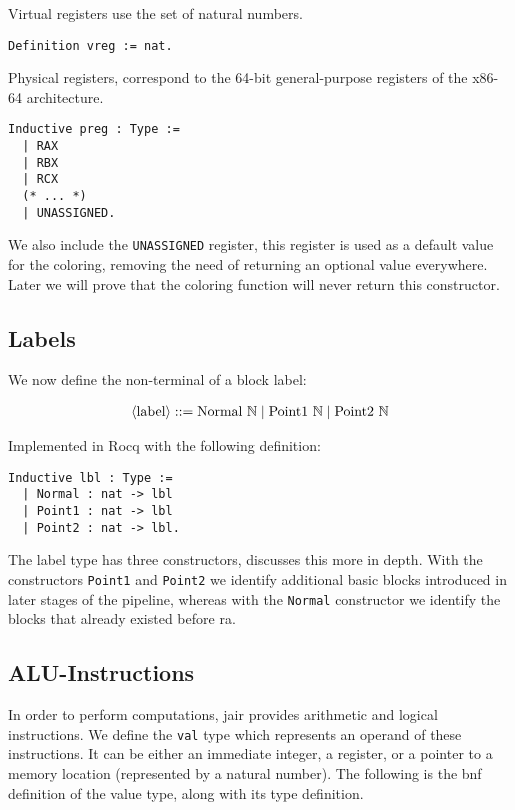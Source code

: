 Virtual registers use the set of natural numbers.

\begin{lstlisting}[style=Rocq]
Definition vreg := nat.
\end{lstlisting}

Physical registers, correspond to the 64-bit general-purpose registers of the x86-64 architecture.

\begin{lstlisting}[style=Rocq]
Inductive preg : Type :=
  | RAX
  | RBX
  | RCX
  (* ... *)
  | UNASSIGNED.
\end{lstlisting}

We also include the \texttt{UNASSIGNED} register, this register is used as a default value for the coloring, removing the need of returning an optional value everywhere. Later we will prove that the coloring function will never return this constructor.

\subsection{Labels}

We now define the non-terminal of a block label:

\begin{align*}
\langle\text{label}\rangle ::= \text{Normal} \ \mathbb N \mid \text{Point1} \ \mathbb N \mid \text{Point2} \ \mathbb N
\end{align*}

Implemented in Rocq with the following definition:

\begin{lstlisting}[style=Rocq]
Inductive lbl : Type :=
  | Normal : nat -> lbl
  | Point1 : nat -> lbl
  | Point2 : nat -> lbl.
\end{lstlisting}

The label type has three constructors,  discusses this more in depth. With the constructors \texttt{Point1} and \texttt{Point2} we identify additional basic blocks introduced in later stages of the pipeline, whereas with the \texttt{Normal} constructor we identify the blocks that already existed before \gls{ra}.

\subsection{ALU-Instructions}

In order to perform computations, \gls{jair} provides arithmetic and logical instructions.
We define the \texttt{val} type which represents an operand of these instructions. It can be either an immediate integer, a register, or a pointer to a memory location (represented by a natural number). The following is the \gls{bnf} definition of the value type, along with its type definition.

